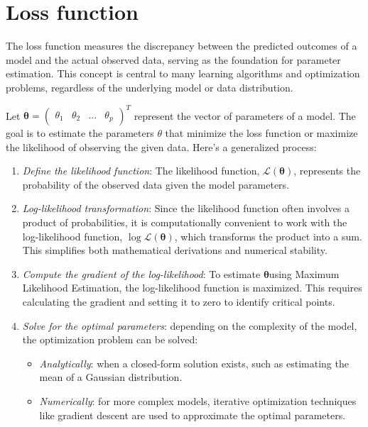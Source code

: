 \section{Loss function}

The loss function measures the discrepancy between the predicted outcomes of a model and the actual observed data, serving as the foundation for parameter estimation.
This concept is central to many learning algorithms and optimization problems, regardless of the underlying model or data distribution.

Let $\boldsymbol{\theta}=\begin{pmatrix} \theta_1 & \theta_2 & \dots & \theta_p \end{pmatrix}^T$ represent the vector of parameters of a model. 
The goal is to estimate the parameters $\theta$ that minimize the loss function or maximize the likelihood of observing the given data.
Here's a generalized process:
\begin{enumerate}
    \item \textit{Define the likelihood function}: The likelihood function, $\mathcal{L}(\boldsymbol{\theta})$, represents the probability of the observed data given the model parameters. 
    \item \textit{Log-likelihood transformation}: Since the likelihood function often involves a product of probabilities, it is computationally convenient to work with the log-likelihood function, $\log \mathcal{L}(\boldsymbol{\theta})$, which transforms the product into a sum. 
        This simplifies both mathematical derivations and numerical stability.
    \item \textit{Compute the gradient of the log-likelihood}: To estimate $\boldsymbol{\theta}$using Maximum Likelihood Estimation, the log-likelihood function is maximized. 
        This requires calculating the gradient and setting it to zero to identify critical points.
    \item \textit{Solve for the optimal parameters}: depending on the complexity of the model, the optimization problem can be solved:
        \begin{itemize}
            \item \textit{Analytically}: when a closed-form solution exists, such as estimating the mean of a Gaussian distribution.
            \item \textit{Numerically}: for more complex models, iterative optimization techniques like gradient descent are used to approximate the optimal parameters.
        \end{itemize}
\end{enumerate}

